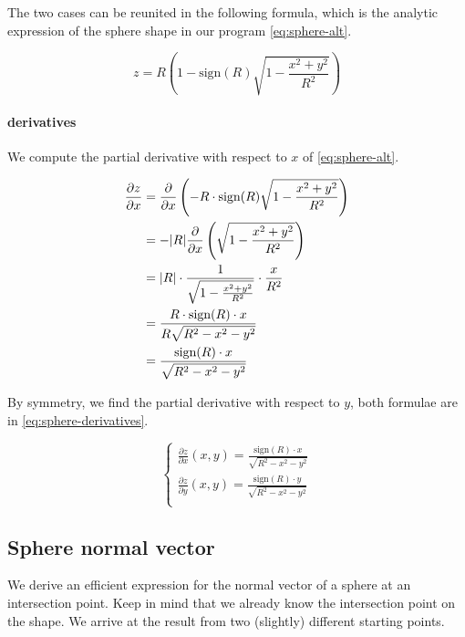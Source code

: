 The two cases can be reunited in the following formula, which is the
analytic expression of the sphere shape in our program \cref{eq:sphere-alt}.

\begin{equation} \label{eq:sphere-alt}
z = R \left( 1 - \textrm{sign}(R) \sqrt{1 - \frac{x^2 + y^2}{R^2}} \right)
\end{equation}

\paragraph{derivatives}
We compute the partial derivative with respect to $x$ of \cref{eq:sphere-alt}.

\begin{equation} \begin{split}
\frac{\partial z}{\partial x} & = 
\frac{\partial}{\partial x}
\left( -R \cdot \textrm{sign}(R) \sqrt{1 - \frac{x^2 + y^2}{R^2}} \right) \\
& = - \abs{R} \frac{\partial}{\partial x}
\left( \sqrt{1 - \frac{x^2 + y^2}{R^2}} \right) \\
& = \abs{R} \cdot \frac{1}{\sqrt{1 - \frac{x^2 + y^2}{R^2}}} \cdot
\frac{x}{R^2} \\
& = \frac{R \cdot \textrm{sign}(R) \cdot x}{R \sqrt{R^2 - x^2 -y^2}} \\
& = \frac{\textrm{sign}(R) \cdot x}{\sqrt{R^2 - x^2 -y^2}}
\end{split} \end{equation}

By symmetry, we find the partial derivative with respect to $y$, both
formulae are in \cref{eq:sphere-derivatives}.

\begin{equation} \label{eq:sphere-derivatives} \begin{cases}
\frac{\partial z}{\partial x} (x, y) =
\frac{\textrm{sign}(R) \cdot x}{\sqrt{R^2 - x^2 -y^2}} \\
\frac{\partial z}{\partial y} (x, y) =
\frac{\textrm{sign}(R) \cdot y}{\sqrt{R^2 - x^2 -y^2}} \\
\end{cases} \end{equation}

\subsection{Sphere normal vector}
We derive an efficient expression for the normal vector of a sphere at
an intersection point. Keep in mind that we already know the intersection
point on the shape. We arrive at the result from two (slightly) different
starting points.


